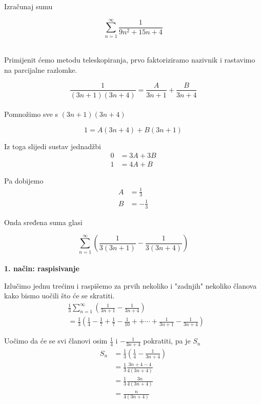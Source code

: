 \documentclass[exam.tex]{subfiles}
\begin{document}
	\begin{task}
		Izračunaj sumu
	
		\[ \sum\limits_{n=1}^\infty \frac{1}{9n^2 + 15n + 4} \] \\[1em]
	\end{task}
	
	Primijenit ćemo metodu teleskopiranja, prvo faktoriziramo nazivnik i rastavimo na parcijalne razlomke.
	
	\[ \frac{1}{(3n + 1)(3n + 4)} = \frac{A}{3n + 1} + \frac{B}{3n + 4} \] \\
	
	Pomnožimo sve s \( (3n + 1)(3n + 4) \)
	
	\[ 1 = A(3n + 4) + B(3n + 1) \]
	
	Iz toga slijedi sustav jednadžbi
	\begin{align*}
		0 &= 3A + 3B \\
		1 &= 4A + B
	\end{align*}
	
	Pa dobijemo
	\begin{align*}
		A &= \frac{1}{3} \\
		B &= - \frac{1}{3}
	\end{align*}
	
	Onda sređena suma glasi
	
	\[ \sum\limits_{n=1}^\infty \left ( \frac{1}{3(3n + 1)} - \frac{1}{3(3n + 4)} \right ) \] \\
	
	\textbf{1. način: raspisivanje}
	
	Izlučimo jednu trećinu i raspišemo za prvih nekoliko i "zadnjih" nekoliko članova kako bismo uočili što će se skratiti.
	\begin{align*}
		& \frac{1}{3} \sum\limits_{n=1}^\infty \left ( \frac{1}{3n + 1} - \frac{1}{3n + 4} \right ) \\ 
		&= \frac{1}{3} \left ( \frac{1}{4} - \frac{1}{7} + \frac{1}{7} - \frac{1}{10} +  + \cdots + \frac{1}{3n + 1} - \frac{1}{3n + 4} \right )
	\end{align*}
	
	Uočimo da će se svi članovi osim \( \frac{1}{4} \) i \( - \frac{1}{3n + 4} \) pokratiti, pa je \( S_n \)
	\begin{align*}
		S_n &= \frac{1}{3} \left ( \frac{1}{4} - \frac{1}{3n + 4} \right ) \\
		&= \frac{1}{3} \frac{3n + 4 - 4}{4(3n + 4)} \\
		&= \frac{1}{3} \frac{3n}{4(3n + 4)} \\
		&= \frac{n}{4(3n + 4)}
	\end{align*}		
	
\end{document}
